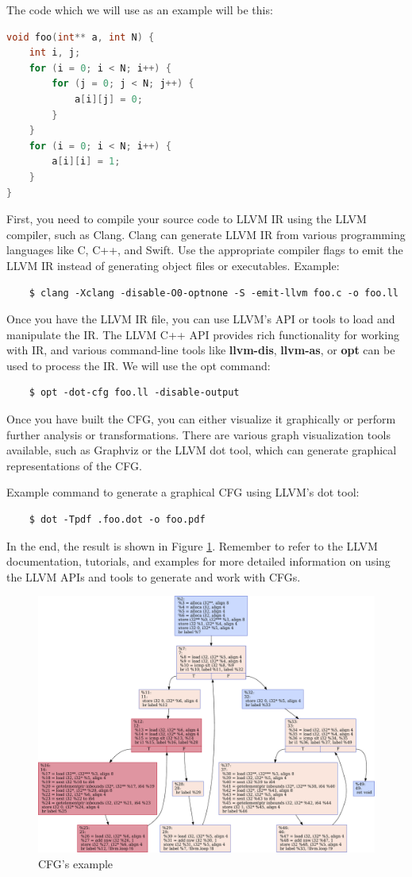 The code which we will use as an example will be this:

\begin{lstlisting}[language=C++]
void foo(int** a, int N) {
    int i, j;
    for (i = 0; i < N; i++) {
        for (j = 0; j < N; j++) {
            a[i][j] = 0;
        }
    }
    for (i = 0; i < N; i++) {
        a[i][i] = 1;
    }
}
\end{lstlisting}

First, you need to compile your source code to LLVM IR using the LLVM compiler, such as Clang. Clang can generate LLVM IR from various programming languages like C, C++, and Swift. Use the appropriate compiler flags to emit the LLVM IR instead of generating object files or executables. Example:

\begin{verbatim}
    $ clang -Xclang -disable-O0-optnone -S -emit-llvm foo.c -o foo.ll
\end{verbatim}

Once you have the LLVM IR file, you can use LLVM's API or tools to load and manipulate the IR. The LLVM C++ API provides rich functionality for working with IR, and various command-line tools like \textbf{llvm-dis}, \textbf{llvm-as}, or \textbf{opt} can be used to process the IR. We will use the opt command:

\begin{verbatim}
    $ opt -dot-cfg foo.ll -disable-output
\end{verbatim}

Once you have built the CFG, you can either visualize it graphically or perform further analysis or transformations. There are various graph visualization tools available, such as Graphviz or the LLVM dot tool, which can generate graphical representations of the CFG.

Example command to generate a graphical CFG using LLVM's dot tool:

\begin{verbatim}
    $ dot -Tpdf .foo.dot -o foo.pdf
\end{verbatim}

In the end, the result is shown in Figure \ref{fig:cfg_foo}. Remember to refer to the LLVM documentation, tutorials, and examples for more detailed information on using the LLVM APIs and tools to generate and work with CFGs.

\begin{figure}[!ht]
    \centering
    \includegraphics[width=\textwidth]{img/cfg.pdf}
    \caption{CFG's example}
    \label{fig:cfg_foo}
\end{figure}
